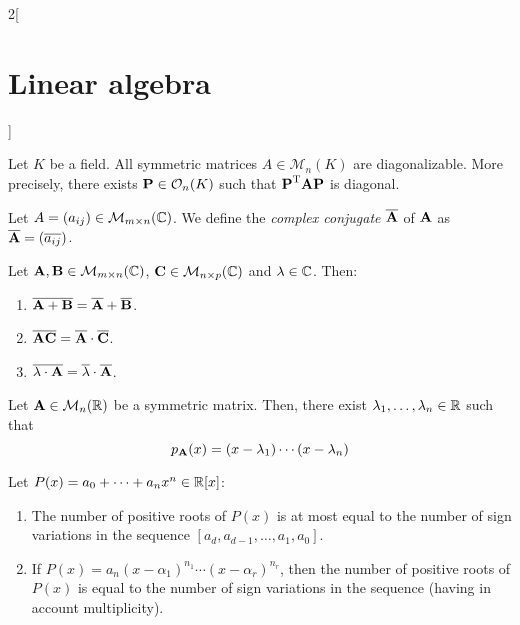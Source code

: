 \documentclass[../../../main_math.tex]{subfiles}
\begin{document}
\begin{multicols}{2}[\section{Linear algebra}]
\begin{theorem}
  \end{theorem}
  \begin{corollary}\label{LA:symmetric-diagonalizable}
    Let $K$ be a field. All symmetric matrices $A\in\mathcal{M}_n(K)$ are diagonalizable. More precisely, there exists $\boldsymbol{\mathrm{P}}\in\mathcal{O}_n(K)$ such that ${\boldsymbol{\mathrm{P}}}^{\mathrm{T}}\boldsymbol{\mathrm{A}}\boldsymbol{\mathrm{P}}$ is diagonal.
  \end{corollary}
  \begin{definition}
    Let $A=(a_{ij})\in\mathcal{M}_{m\times n}(\mathbb{C})$. We define the \emph{complex conjugate} $\overline{\boldsymbol{\mathrm{A}}}$ of $\boldsymbol{\mathrm{A}}$ as $\overline{\boldsymbol{\mathrm{A}}}=(\overline{a_{ij}})$.
  \end{definition}
  \begin{proposition}
    Let $\boldsymbol{\mathrm{A}},\boldsymbol{\mathrm{B}}\in\mathcal{M}_{m\times n}(\mathbb{C})$, $\boldsymbol{\mathrm{C}}\in\mathcal{M}_{n\times p}(\mathbb{C})$ and $\lambda\in\mathbb{C}$. Then:
    \begin{enumerate}
      \item $\overline{\boldsymbol{\mathrm{A}}+\boldsymbol{\mathrm{B}}}=\overline{\boldsymbol{\mathrm{A}}}+\overline{\boldsymbol{\mathrm{B}}}$.
      \item $\overline{\boldsymbol{\mathrm{A}}\boldsymbol{\mathrm{C}}}=\overline{\boldsymbol{\mathrm{A}}}\cdot\overline{\boldsymbol{\mathrm{C}}}$.
      \item $\overline{\lambda\cdot\boldsymbol{\mathrm{A}}}=\overline{\lambda}\cdot\overline{\boldsymbol{\mathrm{A}}}$.
    \end{enumerate}
  \end{proposition}
  \begin{corollary}
    Let $\boldsymbol{\mathrm{A}}\in\mathcal{M}_n(\mathbb{R})$ be a symmetric matrix. Then, there exist $\lambda_1,\ldots,\lambda_n\in\mathbb{R}$ such that $$p_{\boldsymbol{\mathrm{A}}}(x)=(x-\lambda_1 )\cdots(x-\lambda_n)$$
  \end{corollary}
  \begin{theorem}
    Let $P(x)=a_0+\cdots+a_nx^n\in\mathbb{R}[x]$:
    \begin{enumerate}
      \item The number of positive roots of $P(x)$ is at most equal to the number of sign variations in the sequence $[a_d,a_{d-1},\ldots,a_1,a_0]$.
      \item If $P(x)=a_n(x-\alpha_1)^{n_1}\cdots(x-\alpha_r)^{n_r}$, then the number of positive roots of $P(x)$ is equal to the number of sign variations in the sequence (having in account multiplicity).
    \end{enumerate}
  \end{theorem}
\end{multicols}
\end{document}
